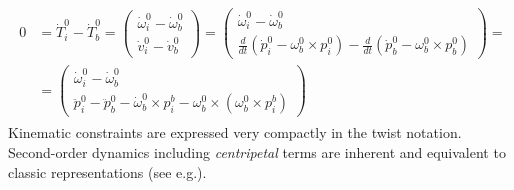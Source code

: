 \documentclass[a4paper,twoside, openright,12pt]{report}
\begin{document}
\begin{eqnarray}
\begin{aligned}
0 &= \dot{T}_i^0 - \dot{T}_b^0 = \begin{pmatrix}
\dot{\omega}_i^0 - \dot{\omega}_b^0 \\ \dot{v}_i^0 - \dot{v}_b^0
\end{pmatrix} =
\begin{pmatrix}
\dot{\omega}_i^0 - \dot{\omega}_b^0 \\ \frac{d}{dt}(\dot{p}_i^0 - \omega_b^0 \times p_i^0) - \frac{d}{dt}(\dot{p}_b^0 - \omega_b^0 \times p_b^0)
\end{pmatrix}= 
\\ &=
\begin{pmatrix}
\dot{\omega}_i^0 - \dot{\omega}_b^0 \\
\ddot{p}_i^0 - \ddot{p}_b^0 - \dot{\omega}_b^0 \times p_i^b - \omega_b^0 \times (\omega_b^0 \times p_i^b)
\end{pmatrix}
\end{aligned}
\end{eqnarray}
Kinematic constraints are expressed very compactly in the twist notation. Second-order dynamics including \emph{centripetal} terms are inherent and equivalent to classic representations (see e.g.\cite{Erhart_16}).\\
\end{document}
